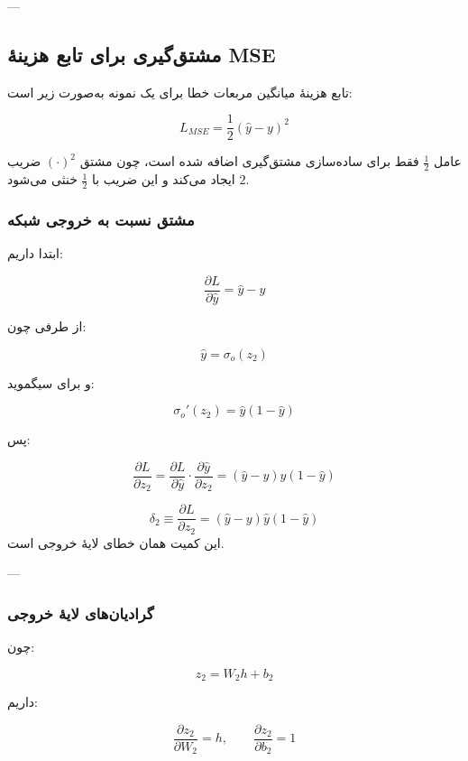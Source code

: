 \documentclass[12pt,a4paper]{article}
\begin{document}
---

\subsection{مشتق‌گیری برای تابع هزینهٔ MSE}

تابع هزینهٔ میانگین مربعات خطا برای یک نمونه به‌صورت زیر است:

\[
L_{MSE}=\frac{1}{2}(\hat{y}-y)^2
\]

\begin{tcolorbox}[colback=softorange,colframe=golden,title=نکته کلیدی]
	عامل \(\frac{1}{2}\) فقط برای ساده‌سازی مشتق‌گیری اضافه شده است، چون مشتق \((\cdot)^2\) ضریب \(2\) ایجاد می‌کند و این ضریب با \(\frac{1}{2}\) خنثی می‌شود.
\end{tcolorbox}

\subsubsection{مشتق نسبت به خروجی شبکه}

ابتدا داریم:

\[
\frac{\partial L}{\partial \hat{y}}=\hat{y}-y
\]

از طرفی چون:

\[
\hat{y}=\sigma_o(z_2)
\]

و برای سیگموید:

\[
\sigma_o'(z_2)=\hat{y}(1-\hat{y})
\]

پس:

\[
\frac{\partial L}{\partial z_2}
=
\frac{\partial L}{\partial \hat{y}}
\cdot
\frac{\partial \hat{y}}{\partial z_2}
=
(\hat{y}-y)\hat{y}(1-\hat{y})
\]

\begin{tcolorbox}[colback=softgreen,colframe=mygreen,title=رابطهٔ مهم]
	\[
	\boxed{
		\delta_2 \equiv \frac{\partial L}{\partial z_2}
		=
		(\hat{y}-y)\hat{y}(1-\hat{y})
	}
	\]
	این کمیت همان خطای لایهٔ خروجی است.
\end{tcolorbox}

---

\subsubsection{گرادیان‌های لایهٔ خروجی}

چون:

\[
z_2=W_2h+b_2
\]

داریم:

\[
\frac{\partial z_2}{\partial W_2}=h,
\qquad
\frac{\partial z_2}{\partial b_2}=1
\]
\end{document}
